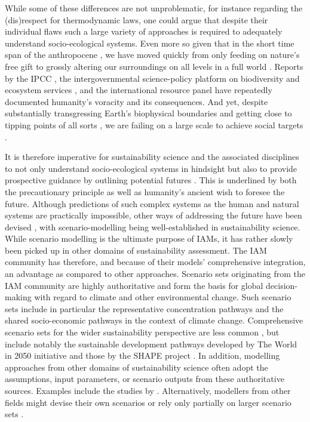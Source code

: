 While some of these differences are not unproblematic, for instance regarding the (dis)respect for thermodynamic laws, one could argue that despite their individual flaws such a large variety of approaches is required to adequately understand socio-ecological systems. Even more so given that in the short time span of the anthropocene \parencite{crutzen_2006}, we have moved quickly from only feeding on nature's free gift \parencite{karsten_1987} to grossly altering our surroundings on all levels in a full world \parencite{daly_2005}. Reports by the IPCC \parencite[e.g.][]{ipcc_2022}, the intergovernmental science-policy platform on biodiversity and ecosystem services \parencite*[e.g. IPBES,][]{ipbes_2019}, and the international resource panel \parencite[e.g.][]{unep_2016} have repeatedly documented humanity's voracity and its consequences. And yet, despite substantially transgressing Earth's biophysical boundaries and getting close to tipping points of all sorts \parencite{ceballos_2015,steffen_2015, steffen_2018}, we are failing on a large scale to achieve social targets \parencite{fanning_2022}.

It is therefore imperative for sustainability science and the associated disciplines to not only understand socio-ecological systems in hindsight \parencite{kates_2001} but also to provide prospective guidance by outlining potential futures \parencite{swart_2004}. This is underlined by both the precautionary principle\footnotemark{} as well as humanity's ancient wish to foresee the future. Although predictions of such complex systems as the human and natural systems are practically impossible, other ways of addressing the future have been devised \parencite{polasky_2011}, with scenario-modelling being well-established in sustainability science. While scenario modelling is the ultimate purpose of IAMs, it has rather slowly been picked up in other domains of sustainability assessment. The IAM community has therefore, and because of their models' comprehensive integration, an advantage as compared to other approaches. Scenario sets originating from the IAM community are highly authoritative and form the basis for global decision-making with regard to climate and other environmental change. Such scenario sets include in particular the representative concentration pathways \parencite[RCPs;][]{vanvuuren_2011_rcp} and the shared socio-economic pathways \parencite[SSPs;][]{riahi_2017,oneill_2014} in the context of climate change. Comprehensive scenario sets for the wider sustainability perspective are less common \parencite{vansoest_2019}, but include notably the sustainable development pathways developed by The World in 2050 initiative \parencite{twi_2018} and those by the SHAPE project \parencite[e.g.][]{soergel_2021}. In addition, modelling approaches from other domains of sustainability science often adopt the assumptions, input parameters, or scenario outputs from these authoritative sources. Examples include the studies by \textcite{deetman_2018,beltran_2020,schandl_2020}. Alternatively, modellers from other fields might devise their own scenarios or rely only partially on larger scenario sets \parencite[for example][]{pauliuk_2013}.

